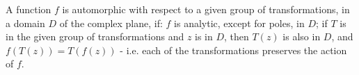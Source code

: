 A function $f$ is automorphic with respect to a given group of
transformations, in a domain $D$ of the complex plane, if:
$f$ is analytic, except for poles, in $D$;
if $T$ is in the given group of transformations and $z$ is in $D$,
then $T(z)$ is also in $D$, and $f(T(z))=T(f(z))$ - i.e. each of the
transformations preserves the action of $f$.